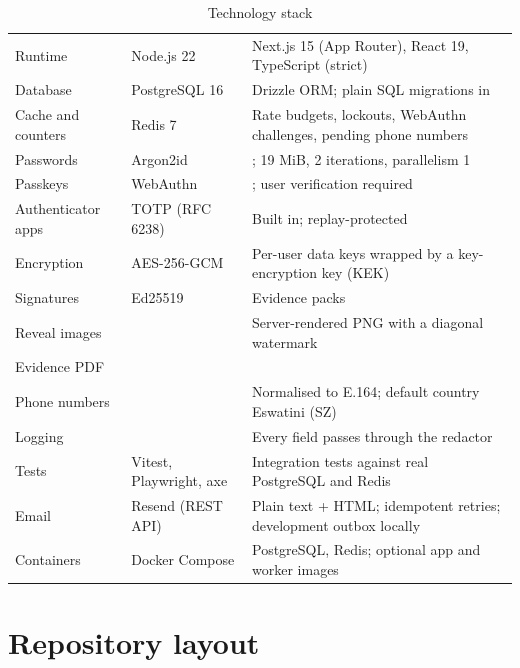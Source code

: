 \begin{table}[H]
\centering\small
\caption{Technology stack}\label{tab:stack}
\begin{tabularx}{\linewidth}{@{}L{3.6cm}L{4.4cm}Y@{}}
\toprule
{} &  &  \\
\midrule
Runtime & Node.js 22 & Next.js 15 (App Router), React 19, TypeScript (strict) \\
Database & PostgreSQL 16 & Drizzle ORM; plain SQL migrations in  \\
Cache and counters & Redis 7 & Rate budgets, lockouts, WebAuthn challenges, pending phone numbers \\
Passwords & Argon2id & ; 19 MiB, 2 iterations, parallelism 1 \\
Passkeys & WebAuthn & ; user verification required \\
Authenticator apps & TOTP (RFC 6238) & Built in; replay-protected \\
Encryption & AES-256-GCM & Per-user data keys wrapped by a key-encryption key (KEK) \\
Signatures & Ed25519 & Evidence packs \\
Reveal images &  & Server-rendered PNG with a diagonal watermark \\
Evidence PDF &  & \\
Phone numbers &  & Normalised to E.164; default country Eswatini (SZ) \\
Logging &  & Every field passes through the redactor \\
Tests & Vitest, Playwright, axe & Integration tests against real PostgreSQL and Redis \\
Email & Resend (REST API) & Plain text + HTML; idempotent retries; development outbox locally \\
Containers & Docker Compose & PostgreSQL, Redis; optional app and worker images \\
\bottomrule
\end{tabularx}
\end{table}

\section{Repository layout}

